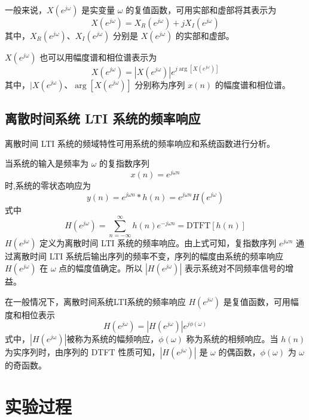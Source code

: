 \documentclass[12pt,AutoFakeBold]{article}
\begin{document}
一般来说，$X(e^{j\omega})$ 是实变量 $\omega$ 的复值函数，可用实部和虚部将其表示为
%
\begin{equation*}
X(e^{j\omega})=X_R(e^{j\omega})+jX_I(e^{j\omega})
\end{equation*}
%
其中，$X_R(e^{j\omega})$、$X_I(e^{j\omega})$ 分别是 $X(e^{j\omega})$ 的实部和虚部。

$X(e^{j\omega})$ 也可以用幅度谱和相位谱表示为
%
\begin{equation*}
X(e^{j\omega})=|X(e^{j\omega})|e^{j\arg[X(e^{j\omega})]}
\end{equation*}
%
其中，$|X(e^{j\omega})$、$\arg[X(e^{j\omega})]$ 分别称为序列 $x(n)$ 的幅度谱和相位谱。

\subsection{离散时间系统 LTI 系统的频率响应}

离散时间 LTI 系统的频域特性可用系统的频率响应和系统函数进行分析。

当系统的输入是频率为 $\omega$ 的复指数序列
%
\begin{equation*}
x(n)=e^{j\omega n}
\end{equation*}
%
时,系统的零状态响应为
%
\begin{equation*}
y(n)=e^{j\omega n}*h(n)=e^{j\omega n}H(e^{j\omega})
\end{equation*}
%
式中
%
\begin{equation*}
H(e^{j\omega})=\sum_{n=-\infty}^\infty h(n)e^{-j\omega n}=\mathrm{DTFT}[h(n)]
\end{equation*}
%
$H(e^{j\omega})$ 定义为离散时间 LTI 系统的频率响应。由上式可知，复指数序列 $e^{j\omega n}$ 通过离散时间 LTI 系统后输出序列的频率不变，序列的幅度由系统的频率响应 $H(e^{j\omega})$ 在 $\omega$ 点的幅度值确定。所以 $|H(e^{j\omega})|$ 表示系统对不同频率信号的增益。

在一般情况下，离散时间系统LTI系统的频率响应 $H(e^{j\omega})$ 是复值函数，可用幅度和相位表示
%
\begin{equation*}
H(e^{j\omega})=|H(e^{j\omega})|e^{j\phi(\omega)}
\end{equation*}
%
式中，$|H(e^{j\omega})|$被称为系统的幅频响应，$\phi(\omega)$ 称为系统的相频响应。当 $h(n)$ 为实序列时，由序列的 DTFT 性质可知，$|H(e^{j\omega})|$ 是 $\omega$ 的偶函数，$\phi(\omega)$ 为 $\omega$ 的奇函数。


\section{实验过程}
\end{document}
